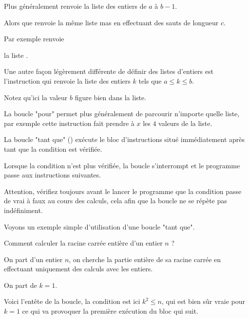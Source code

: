 \change
Plus généralement  renvoie la liste des entiers de 
$a$ à $b-1$.

\change
Alors que  renvoie la même liste mas en effectuant des sauts de longueur $c$.

\change
Par exemple  renvoie 

la liste \codeinline{[0,5,10,15,...,100]}.

\change
Une autre façon légèrement différente de définir des listes d'entiers 
est l'instruction \codeinline{[a..b]} qui renvoie la liste des entiers $k$ tels que $a\le k \le b$.

Notez qu'ici la valeur $b$ figure bien dans la liste.

\change
La boucle "pour" permet plus généralement de parcourir n'importe quelle liste,
par exemple cette instruction fait prendre à $x$ les $4$ valeurs
de la liste.


\diapo

\change

La boucle "tant que" () exécute le bloc d'instructions situé immédiatement après
tant que la condition est vérifiée. 

Lorsque la condition n'est plus vérifiée, la boucle s'interrompt et le programme passe
aux instructions suivantes.

Attention, vérifiez toujours avant le lancer le programme que la condition passe de vrai à faux au cours des calculs, 
cela afin que la boucle ne se répète pas indéfiniment. 

\diapo

Voyons un exemple simple d'utilisation d'une boucle "tant que".

Comment calculer la racine carrée entière d'un entier $n$ ?

\change

On part d'un entier $n$, on cherche la partie entière de sa racine carrée
en effectuant uniquement des calculs avec les entiers.

\change 

On part de $k=1$.

\change

Voici l'entête de la boucle, la condition est ici $k^2 \le n$,
qui est bien sûr vraie pour $k=1$ ce qui va provoquer la première exécution du bloc qui suit.

\change

